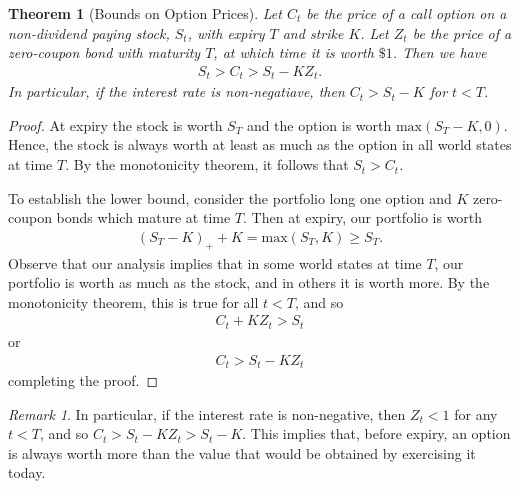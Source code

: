 \documentclass[12pt]{article}
\theoremstyle{plain}
\newtheorem{theorem}{Theorem}
\theoremstyle{definition}
\theoremstyle{remark}
\newtheorem*{remark}{Remark}
\numberwithin{equation}{section}  %
\begin{document}
\begin{theorem}[Bounds on Option Prices]\label{thm:bound-op-prices}
	Let $C_t$ be the price of a call option on a non-dividend paying stock, 
	$S_t$, with
	expiry $T$ and strike $K$. Let $Z_t$ be the price of a zero-coupon bond 
	with maturity $T$, at which time
	it is worth $\$1$. 
	Then we have
	\begin{equation*}
		\begin{split}
			S_{t} > C_{t} > S_{t} - K Z_{t}.
		\end{split}
	\end{equation*}
	In particular, if the interest rate is non-negatiave, then $C_{t} >
	S_{t} - K$ for $t < T$. 
\end{theorem}
\begin{proof}
	At expiry the stock is worth $S_{T}$ and the option is worth
	$\text{max}(S_{T} - K, 0)$. Hence, the stock is always worth at least as 
	much
	as the option in all world states at time $T$. By the monotonicity theorem, 
	it follows
	that $S_{t} > C_{t}$. 

	To establish the lower bound, consider the portfolio long one option and 
	$K$ zero-coupon bonds which
	mature at time $T$. Then at expiry, our portfolio is worth
	\begin{equation*}
		\begin{split}
			{(S_{T} - K)}_{+} + K =  \text{max}(S_{T}, K) \ge S_{T}.
		\end{split}
	\end{equation*}
	Observe that our analysis implies that in some world states at time $T$, 
	our portfolio is worth as much as the stock, and in others it is worth 
	more. By the monotonicity theorem, this is true for all $t < T$, and so
	\begin{equation*}
		\begin{split}
			C_{t} + K Z_{t} > S_{t} 
		\end{split}
	\end{equation*}
	or
	\begin{equation*}
		\begin{split}
			C_{t} > S_{t} - K Z_{t}
		\end{split}
	\end{equation*}
	completing the proof.
\end{proof}
\begin{remark}\label{rem:nev-ex}
	In particular, if the interest rate is non-negative, then $Z_{t} < 1$ for 
	any $t < T$, and so
	$C_{t} > S_{t} - KZ_{t} > S_{t} - K$.
	This implies that, before expiry, an option is always 
	worth more than the value that would be obtained by exercising it today.
\end{remark}
\end{document}
